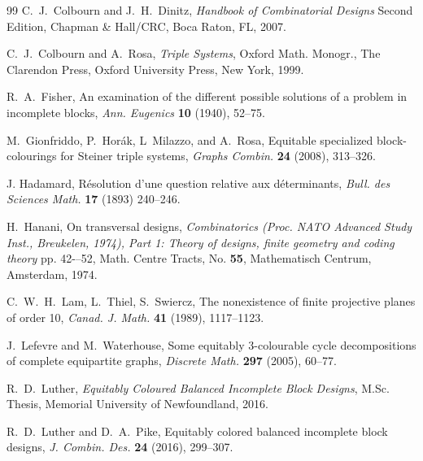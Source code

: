 \documentclass[12pt]{article}
\theoremstyle{definition}
\begin{document}
\begin{thebibliography}{99}
C.~J.~Colbourn and J.~H.~Dinitz, \emph{Handbook of Combinatorial Designs} Second Edition, Chapman \& Hall/CRC, Boca Raton, FL, 2007.


C.~J.~Colbourn and A.~Rosa, \emph{Triple Systems}, Oxford Math. Monogr., The Clarendon Press, Oxford University Press, New York, 1999.


R.~A.~Fisher, An examination of the different possible solutions of a problem in incomplete blocks, \emph{Ann. Eugenics} \textbf{10} (1940), 52--75.

M.~Gionfriddo, P.~Horák, L~Milazzo, and A.~Rosa, Equitable specialized block-colourings for Steiner triple systems, \emph{Graphs Combin.} \textbf{24} (2008), 313--326.


J. Hadamard, R\'esolution d’une question relative aux d\'eterminants, \emph{Bull. des Sciences Math.} \textbf{17} (1893) 240--246. 

H.~Hanani, On transversal designs, \emph{Combinatorics (Proc. NATO Advanced Study Inst., Breukelen, 1974), Part 1: Theory of designs, finite geometry and coding theory} pp. 42-–52, Math. Centre Tracts, No. \textbf{55}, Mathematisch Centrum, Amsterdam, 1974.

C.~W.~H.~Lam, L.~Thiel, S.~Swiercz, The nonexistence of finite projective planes of order 10, \emph{Canad. J. Math.} \textbf{41} (1989), 1117--1123.

J.~Lefevre and M.~Waterhouse, Some equitably 3-colourable cycle decompositions of complete equipartite graphs, \emph{Discrete Math.} \textbf{297} (2005), 60--77.

R.~D.~Luther, \emph{Equitably Coloured Balanced Incomplete Block Designs}, M.Sc. Thesis, Memorial University of Newfoundland, 2016. 

R.~D.~Luther and D.~A.~Pike, Equitably colored balanced incomplete block designs, \emph{J. Combin. Des.} \textbf{24} (2016), 299--307.


\end{thebibliography}
\end{document}
